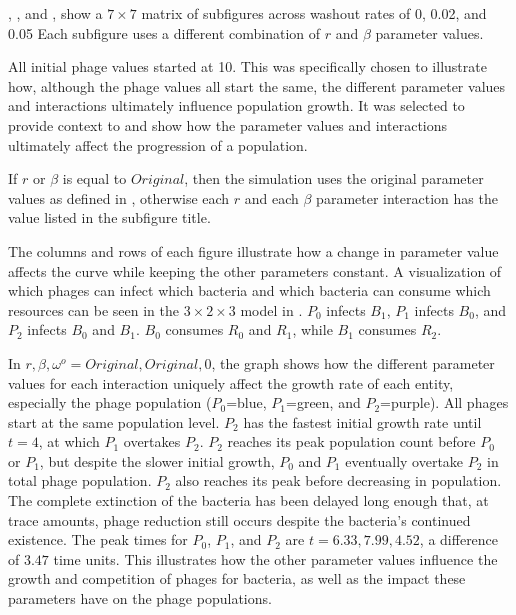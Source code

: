 , , and , show a $7\times7$ matrix of subfigures across washout rates of 0, 0.02, and 0.05
Each subfigure uses a different combination of $r$ and $\beta$ parameter values. 

All initial phage values started at 10. 
This was specifically chosen to illustrate how, although the phage values all start the same, the different parameter values and interactions ultimately influence population growth. 
It was selected to provide context to and show how the parameter values and interactions ultimately affect the progression of a population. 

If $r$ or $\beta$ is equal to $Original$, then the simulation uses the original parameter values as defined in , otherwise each $r$ and each $\beta$ parameter interaction has the value listed in the subfigure title. 

The columns and rows of each figure illustrate how a change in parameter value affects the curve while keeping the other parameters constant. 
A visualization of which phages can infect which bacteria and which bacteria can consume which resources can be seen in the $3 \times 2\times 3$ model in . 
$P_0$ infects $B_1$, $P_1$ infects $B_0$, and $P_2$ infects $B_0$ and $B_1$. 
$B_0$ consumes $R_0$ and $R_1$, while $B_1$ consumes $R_2$. 

In $r, \beta, \omega^o=Original, Original, 0$, the graph shows how the different parameter values for each interaction uniquely affect the growth rate of each entity, especially the phage population ($P_0$=blue, $P_1$=green, and $P_2$=purple). 
All phages start at the same population level. 
$P_2$ has the fastest initial growth rate until $t=4$, at which $P_1$ overtakes $P_2$. 
$P_2$ reaches its peak population count before $P_0$ or $P_1$, but despite the slower initial growth, $P_0$ and $P_1$ eventually overtake $P_2$ in total phage population. 
$P_2$ also reaches its peak before decreasing in population. 
The complete extinction of the bacteria has been delayed long enough that, at trace amounts, phage reduction still occurs despite the bacteria's continued existence. 
The peak times for $P_0$, $P_1$, and $P_2$ are $t=6.33, 7.99, 4.52$, a difference of $3.47$ time units. 
This illustrates how the other parameter values influence the growth and competition of phages for bacteria, as well as the impact these parameters have on the phage populations. 

